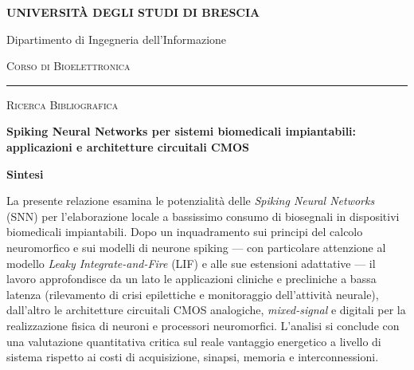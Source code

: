 \documentclass[11pt, a4paper]{article}
\newcommand{\NomeUniversita}{Università degli Studi di Brescia}
\newcommand{\NomeDipartimento}{Dipartimento di Ingegneria dell'Informazione}
\newcommand{\NomeCorso}{Corso di Bioelettronica}
\begin{document}
\begin{titlepage}
  \thispagestyle{empty}
  \centering
  \vspace*{0.6cm}

  {\Large\bfseries\MakeUppercase{\NomeUniversita}\par}
  \vspace{0.25cm}
  {\normalsize\NomeDipartimento\par}
  \vspace{0.15cm}
  {\normalsize\textsc{\NomeCorso}\par}

  \vspace{0.6cm}
  \rule{\textwidth}{0.6pt}
  \vspace{1.8cm}

  {\small\textsc{Ricerca Bibliografica}\par}
  \vspace{0.45cm}

  {\Huge\bfseries
    Spiking Neural Networks per sistemi biomedicali impiantabili:\\[0.35em]
    \LARGE applicazioni e architetture circuitali CMOS\par}

  \vspace{1.5cm}
  \begin{minipage}{0.88\textwidth}
    \small
    \begin{center}
      \textbf{Sintesi}
    \end{center}
    \vspace{-0.2cm}
    La presente relazione esamina le potenzialità delle \emph{Spiking Neural Networks} (SNN) per l'elaborazione locale a bassissimo consumo di biosegnali in dispositivi biomedicali impiantabili. Dopo un inquadramento sui principi del calcolo neuromorfico e sui modelli di neurone spiking — con particolare attenzione al modello \emph{Leaky Integrate-and-Fire} (LIF) e alle sue estensioni adattative — il lavoro approfondisce da un lato le applicazioni cliniche e precliniche a bassa latenza (rilevamento di crisi epilettiche e monitoraggio dell'attività neurale), dall'altro le architetture circuitali CMOS analogiche, \emph{mixed-signal} e digitali per la realizzazione fisica di neuroni e processori neuromorfici. L'analisi si conclude con una valutazione quantitativa critica sul reale vantaggio energetico a livello di sistema rispetto ai costi di acquisizione, sinapsi, memoria e interconnessioni.
  \end{minipage}


\end{titlepage}
\end{document}
